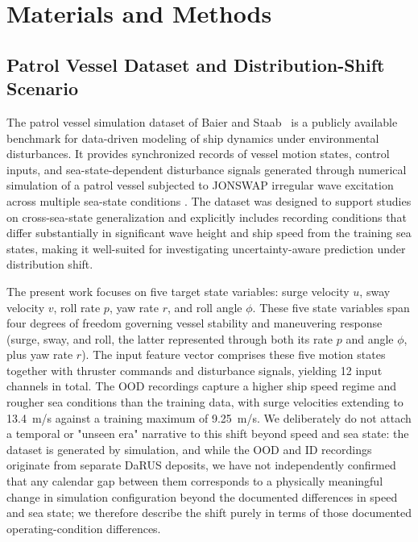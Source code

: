 \documentclass[a4paper,fleqn]{cas-sc}
\begin{document}
\section{Materials and Methods}

\subsection{Patrol Vessel Dataset and Distribution-Shift Scenario}
\label{sec:dataset}

The patrol vessel simulation dataset of Baier and Staab~\cite{baier2022darus} is a publicly available benchmark for data-driven modeling of ship dynamics under environmental disturbances. It provides synchronized records of vessel motion states, control inputs, and sea-state-dependent disturbance signals generated through numerical simulation of a patrol vessel subjected to JONSWAP irregular wave excitation \cite{pierson1964spectral, hasselmann1973jonswap} across multiple sea-state conditions \cite{baier2022darus, baier2021hybrid}. The dataset was designed to support studies on cross-sea-state generalization and explicitly includes recording conditions that differ substantially in significant wave height and ship speed from the training sea states, making it well-suited for investigating uncertainty-aware prediction under distribution shift.

The present work focuses on five target state variables: surge velocity $u$, sway velocity $v$, roll rate $p$, yaw rate $r$, and roll angle $\phi$. These five state variables span four degrees of freedom governing vessel stability and maneuvering response (surge, sway, and roll, the latter represented through both its rate $p$ and angle $\phi$, plus yaw rate $r$). The input feature vector comprises these five motion states together with thruster commands and disturbance signals, yielding 12 input channels in total. The OOD recordings capture a higher ship speed regime and rougher sea conditions than the training data, with surge velocities extending to 13.4~m/s against a training maximum of 9.25~m/s. We deliberately do not attach a temporal or "unseen era" narrative to this shift beyond speed and sea state: the dataset is generated by simulation, and while the OOD and ID recordings originate from separate DaRUS deposits, we have not independently confirmed that any calendar gap between them corresponds to a physically meaningful change in simulation configuration beyond the documented differences in speed and sea state; we therefore describe the shift purely in terms of those documented operating-condition differences.
\end{document}

